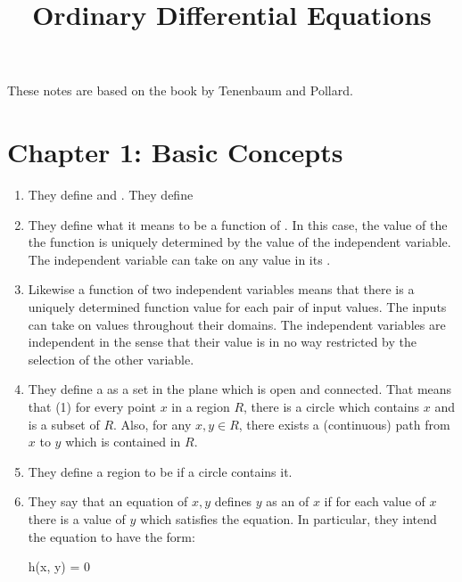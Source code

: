 \documentclass[11pt, oneside]{amsart}
\begin{document}
\title{Ordinary Differential Equations}
\maketitle

These notes are based on the book by Tenenbaum and Pollard.

\section{Chapter 1: Basic Concepts}

\begin{enumerate}
  \item They define  and . They define

  \item They define what it means to be a function of . In this case, the value of the the function is
  uniquely determined by the value of the independent variable. The
  independent variable can take on any value in its .

  \item Likewise a function of two independent variables means that
  there is a uniquely determined function value for each pair of input
  values. The inputs can take on values throughout their domains. The
  independent variables are independent in the sense that their value is
  in no way restricted by the selection of the other variable.

  \item They define a  as a set in the plane which is
  open and connected. That means that (1) for every point $x$ in a
  region $R$, there is a circle which contains $x$ and is a subset of
  $R$. Also, for any $x, y \in R$, there exists a (continuous) path from
  $x$ to $y$ which is contained in $R$.

  \item They define a region to be  if a circle contains
  it.

  \item They say that an equation of $x, y$ defines $y$ as an
   of $x$ if for each value of $x$ there is a
  value of $y$ which satisfies the equation. In particular, they intend
  the equation to have the form:

  \begin{nedqn}
    h(x, y) = 0
  \end{nedqn}


\end{enumerate}
\end{document}
